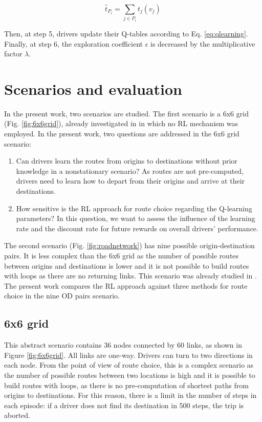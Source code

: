 \documentclass{RITA}
\newcommand{\route}[1]{\ensuremath{P_#1}}	%
\newcommand{\travTime}{\ensuremath{t_j}} 	%
\newcommand{\veh}{\ensuremath{v}}		%
\newcommand{\att}[1]{\ensuremath{\hat{t}_{#1}}}		%
\begin{document}
\begin{equation}
\label{eq:att}
\att{\route{i}} = \sum_{j \in \route{i}} \travTime(\veh_j)
\end{equation}

Then, at step 5, drivers update their Q-tables according to Eq. \eqref{eq:qlearning}. Finally, at step 6, the exploration coefficient $\epsilon$ is decreased by the multiplicative factor $\lambda$.

\section{Scenarios and evaluation}
\label{sec:scenario}
In the present work, two scenarios are studied. The first scenario is a 6x6 grid (Fig. \ref{fig:6x6grid}), already investigated in \cite{Bazzan+2007alag,Bazzan+2008alamas} in which no RL mechanism was employed. In the present work, two questions are addressed in the 6x6 grid scenario:

\begin{enumerate}
  \item Can drivers learn the routes from origins to destinations without prior knowledge in a nonstationary scenario? As routes are not pre-computed, drivers need to learn how to depart from their origins and arrive at their destinations.
  \item How sensitive is the RL approach for route choice regarding the Q-learning parameters? In this question, we want to assess the influence of the learning rate and the discount rate for future rewards on overall drivers' performance.
\end{enumerate}

The second scenario (Fig. \ref{fig:roadnetwork}) has nine possible origin-destination pairs. It is less complex than the 6x6 grid as the number of possible routes between origins and destinations is lower and it is not possible to build routes with loops as there are no returning links. This scenario was already studied in \cite{Tavares&Bazzan2012,Galib&Moser2011}. The present work compares the RL approach against three methods for route choice in the nine OD pairs scenario.

\subsection{6x6 grid}
\label{sec:gridDescription}
This abstract scenario contains 36 nodes connected by 60 links, as shown in Figure \ref{fig:6x6grid}. All links are one-way. Drivers can turn to two directions in each node. From the point of view of route choice, this is a complex scenario as the number of possible routes between two locations is high and it is possible to build routes with loops, as there is no pre-computation of shortest paths from origins to destinations. For this reason, there is a limit in the number of steps in each episode: if a driver does not find its destination in 500 steps, the trip is aborted.
\end{document}
